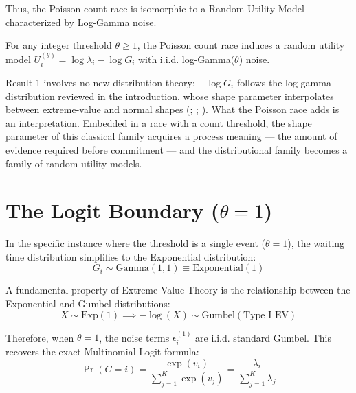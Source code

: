 \documentclass[
  man,
  floatsintext,
  longtable,
  a4paper,
  nolmodern,
  notxfonts,
  notimes,
  colorlinks=true,linkcolor=blue,citecolor=blue,urlcolor=blue]{apa7}
\begin{document}
Thus, the Poisson count race is isomorphic to a Random Utility Model
characterized by Log-Gamma noise.

\begin{tcolorbox}[enhanced jigsaw, colframe=quarto-callout-note-color-frame, leftrule=.75mm, colbacktitle=quarto-callout-note-color!10!white, titlerule=0mm, bottomrule=.15mm, opacityback=0, rightrule=.15mm, toptitle=1mm, bottomtitle=1mm, breakable, title={Result 1 (Log-Gamma Random Utility Family)}, arc=.35mm, coltitle=black, opacitybacktitle=0.6, left=2mm, toprule=.15mm, colback=white]

For any integer threshold \(\theta \ge 1\), the Poisson count race
induces a random utility model
\(U_i^{(\theta)} = \log \lambda_i - \log G_i\) with i.i.d.
log-Gamma(\(\theta\)) noise.

\end{tcolorbox}

Result 1 involves no new distribution theory: \(-\log G_i\) follows the
log-gamma distribution reviewed in the introduction, whose shape
parameter interpolates between extreme-value and normal shapes
(; ; ). What
the Poisson race adds is an interpretation. Embedded in a race with a
count threshold, the shape parameter of this classical family acquires a
process meaning --- the amount of evidence required before commitment
--- and the distributional family becomes a family of random utility
models.

\section{\texorpdfstring{The Logit Boundary
(\(\theta = 1\))}{The Logit Boundary (\textbackslash theta = 1)}}\label{sec-logit-boundary}

In the specific instance where the threshold is a single event
(\(\theta = 1\)), the waiting time distribution simplifies to the
Exponential distribution: \[
G_i \sim \text{Gamma}(1, 1) \equiv \text{Exponential}(1)
\]

A fundamental property of Extreme Value Theory is the relationship
between the Exponential and Gumbel distributions: \[
X \sim \text{Exp}(1) \implies -\log(X) \sim \text{Gumbel}(\text{Type I EV})
\]

Therefore, when \(\theta=1\), the noise terms \(\epsilon_i^{(1)}\) are
i.i.d. standard Gumbel. This recovers the exact Multinomial Logit
formula: \[
\Pr(C=i) = \frac{\exp(v_i)}{\sum_{j=1}^K \exp(v_j)} = \frac{\lambda_i}{\sum_{j=1}^K \lambda_j}
\]
\end{document}
